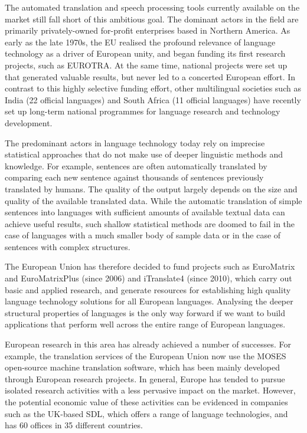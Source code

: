 \begin{multicols}{2}

The automated translation and speech processing tools currently available on the market still fall short of this ambitious goal. The dominant actors in the field are primarily privately-owned for-profit enterprises based in Northern America. As early as the late 1970s, the EU realised the profound relevance of language technology as a driver of European unity, and began funding its first research projects, such as EUROTRA. At the same time, national projects were set up that generated valuable results, but never led to a concerted European effort. In contrast to this highly selective funding effort, other multilingual societies such as India (22 official languages) and South Africa (11 official languages) have recently set up long-term national programmes for language research and technology development. 

The predominant actors in language technology today rely on imprecise statistical approaches that do not make use of deeper linguistic methods and knowledge. For example, sentences are often automatically translated by comparing each new sentence against thousands of sentences previously translated by humans. The quality of the output largely depends on the size and quality of the available translated data. While the automatic translation of simple sentences into languages with sufficient amounts of available textual data can achieve useful results, such shallow statistical methods are doomed to fail in the case of languages with a much smaller body of sample data or in the case of sentences with complex structures.

The European Union has therefore decided to fund projects such as EuroMatrix and EuroMatrixPlus (since 2006) and iTranslate4 (since 2010), which carry out basic and applied research, and generate resources for establishing high quality language technology solutions for all European languages. Analysing the deeper structural properties of languages is the only way forward if we want to build applications that perform well across the entire range of European languages.


European research in this area has already achieved a number of successes. For example, the translation services of the European Union now use the MOSES open-source machine translation software, which has been mainly developed through European research projects. In general, Europe has tended to pursue isolated research activities with a less pervasive impact on the market. However, the potential economic value of these activities can be evidenced in companies such as the UK-based SDL, which offers a range of language technologies, and has 60 offices in 35 different countries.


\end{multicols}
